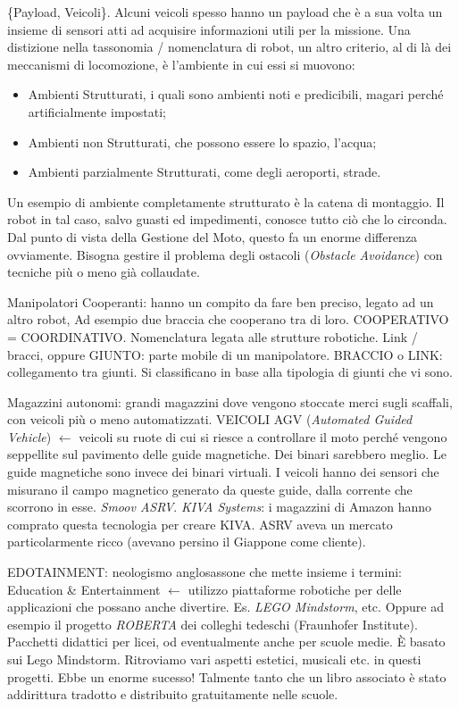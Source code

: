 \{Payload, Veicoli\}. Alcuni veicoli spesso hanno un payload che è a sua volta un insieme di sensori atti ad acquisire informazioni utili per la missione. Una distizione nella tassonomia / nomenclatura di robot, un altro criterio, al di là dei meccanismi di locomozione, è l'ambiente in cui essi si muovono:

\begin{itemize}

\item{Ambienti Strutturati}, i quali sono ambienti noti e predicibili, magari perché artificialmente impostati;
\item{Ambienti non Strutturati}, che possono essere lo spazio, l'acqua;
\item{Ambienti parzialmente Strutturati}, come degli aeroporti, strade.

\end{itemize}

Un esempio di ambiente completamente strutturato è la catena di montaggio. Il robot in tal caso, salvo guasti ed impedimenti, conosce tutto ciò che lo circonda. Dal punto di vista della Gestione del Moto, questo fa un enorme differenza ovviamente. Bisogna gestire il problema degli ostacoli (\emph{Obstacle Avoidance}) con tecniche più o meno già collaudate.

Manipolatori Cooperanti: hanno un compito da fare ben preciso, legato ad un altro robot, Ad esempio due braccia che cooperano tra di loro. COOPERATIVO = COORDINATIVO. Nomenclatura legata alle strutture robotiche. Link / bracci, oppure GIUNTO: parte mobile di un manipolatore. BRACCIO o LINK: collegamento tra giunti. Si classificano in base alla tipologia di giunti che vi sono.

Magazzini autonomi: grandi magazzini dove vengono stoccate merci sugli scaffali, con veicoli più o meno automatizzati. VEICOLI AGV (\emph{Automated Guided Vehicle}) $\leftarrow$ veicoli su ruote di cui si riesce a controllare il moto perché vengono seppellite sul pavimento delle guide magnetiche. Dei binari sarebbero meglio. Le guide magnetiche sono invece dei binari virtuali. I veicoli hanno dei sensori che misurano il campo magnetico generato da queste guide, dalla corrente che scorrono in esse. \emph{Smoov ASRV}. \emph{KIVA Systems}: i magazzini di Amazon hanno comprato questa tecnologia per creare KIVA. ASRV aveva un mercato particolarmente ricco (avevano persino il Giappone come cliente).

EDOTAINMENT: neologismo anglosassone che mette insieme i termini: Education \& Entertainment $\leftarrow$ utilizzo piattaforme robotiche per delle applicazioni che possano anche divertire. Es. \emph{LEGO Mindstorm}, etc. Oppure ad esempio il progetto \emph{ROBERTA} dei colleghi tedeschi (Fraunhofer Institute). Pacchetti didattici per licei, od eventualmente anche per scuole medie. \`E basato sui Lego Mindstorm. Ritroviamo vari aspetti estetici, musicali etc. in questi progetti. Ebbe un enorme sucesso! Talmente tanto che un libro associato è stato addirittura tradotto e distribuito gratuitamente nelle scuole.

